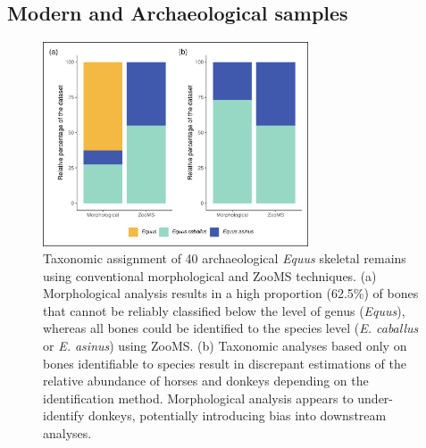 \documentclass[preprint, 3p, authoryear]{elsarticle} %
\begin{document}
\hypertarget{modern-and-archaeological-samples}{%
\subsection{Modern and Archaeological samples}\label{modern-and-archaeological-samples}}



\begin{figure}

{\centering \includegraphics[width=0.70\textwidth]{equid_main_files/figure-latex/resultbarplotr-1} 

}

\caption{Taxonomic assignment of 40 archaeological \emph{Equus} skeletal remains using conventional morphological and ZooMS techniques. (a) Morphological analysis results in a high proportion (62.5\%) of bones that cannot be reliably classified below the level of genus (\emph{Equus}), whereas all bones could be identified to the species level (\emph{E. caballus} or \emph{E. asinus}) using ZooMS. (b) Taxonomic analyses based only on bones identifiable to species result in discrepant estimations of the relative abundance of horses and donkeys depending on the identification method. Morphological analysis appears to under-identify donkeys, potentially introducing bias into downstream analyses.}\label{fig:resultbarplotr}
\end{figure}
\end{document}

